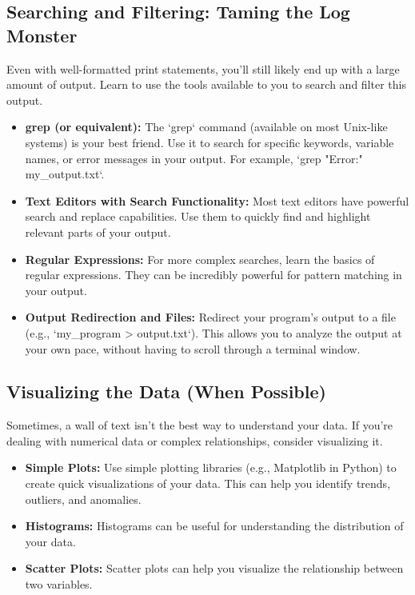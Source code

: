 \documentclass{article}
\begin{document}
\subsection*{Searching and Filtering: Taming the Log Monster}

Even with well-formatted print statements, you'll still likely end up with a large amount of output. Learn to use the tools available to you to search and filter this output.

\begin{itemize}
    \item \textbf{grep (or equivalent):} The `grep` command (available on most Unix-like systems) is your best friend. Use it to search for specific keywords, variable names, or error messages in your output.  For example, `grep "Error:" my_output.txt`.
    \item \textbf{Text Editors with Search Functionality:}  Most text editors have powerful search and replace capabilities. Use them to quickly find and highlight relevant parts of your output.
    \item \textbf{Regular Expressions:} For more complex searches, learn the basics of regular expressions. They can be incredibly powerful for pattern matching in your output.
    \item \textbf{Output Redirection and Files:} Redirect your program's output to a file (e.g., `my_program > output.txt`). This allows you to analyze the output at your own pace, without having to scroll through a terminal window.
\end{itemize}

\subsection*{Visualizing the Data (When Possible)}

Sometimes, a wall of text isn't the best way to understand your data. If you're dealing with numerical data or complex relationships, consider visualizing it.

\begin{itemize}
    \item \textbf{Simple Plots:} Use simple plotting libraries (e.g., Matplotlib in Python) to create quick visualizations of your data. This can help you identify trends, outliers, and anomalies.
    \item \textbf{Histograms:} Histograms can be useful for understanding the distribution of your data.
    \item \textbf{Scatter Plots:} Scatter plots can help you visualize the relationship between two variables.
\end{itemize}
\end{document}
